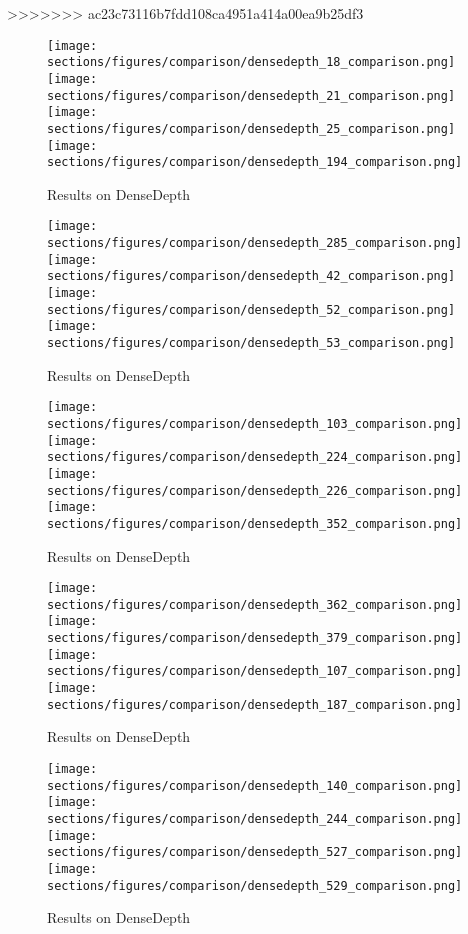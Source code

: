 >>>>>>> ac23c73116b7fdd108ca4951a414a00ea9b25df3
\begin{figure*}
  \texttt{[image: sections/figures/comparison/densedepth\_18\_comparison.png]}
  \texttt{[image: sections/figures/comparison/densedepth\_21\_comparison.png]}
  \texttt{[image: sections/figures/comparison/densedepth\_25\_comparison.png]}
  \texttt{[image: sections/figures/comparison/densedepth\_194\_comparison.png]}
  \caption{Results on DenseDepth}
\end{figure*}
\begin{figure*}
  \texttt{[image: sections/figures/comparison/densedepth\_285\_comparison.png]}
  \texttt{[image: sections/figures/comparison/densedepth\_42\_comparison.png]}
  \texttt{[image: sections/figures/comparison/densedepth\_52\_comparison.png]}
  \texttt{[image: sections/figures/comparison/densedepth\_53\_comparison.png]}
  \caption{Results on DenseDepth}
\end{figure*}
\begin{figure*}
  \texttt{[image: sections/figures/comparison/densedepth\_103\_comparison.png]}
  \texttt{[image: sections/figures/comparison/densedepth\_224\_comparison.png]}
  \texttt{[image: sections/figures/comparison/densedepth\_226\_comparison.png]}
  \texttt{[image: sections/figures/comparison/densedepth\_352\_comparison.png]}
  \caption{Results on DenseDepth}
\end{figure*}
\begin{figure*}
  \texttt{[image: sections/figures/comparison/densedepth\_362\_comparison.png]}
  \texttt{[image: sections/figures/comparison/densedepth\_379\_comparison.png]}
  \texttt{[image: sections/figures/comparison/densedepth\_107\_comparison.png]}
  \texttt{[image: sections/figures/comparison/densedepth\_187\_comparison.png]}
  \caption{Results on DenseDepth}
\end{figure*}
\begin{figure*}
  \texttt{[image: sections/figures/comparison/densedepth\_140\_comparison.png]}
  \texttt{[image: sections/figures/comparison/densedepth\_244\_comparison.png]}
  \texttt{[image: sections/figures/comparison/densedepth\_527\_comparison.png]}
  \texttt{[image: sections/figures/comparison/densedepth\_529\_comparison.png]}
  \caption{Results on DenseDepth}
\end{figure*}
